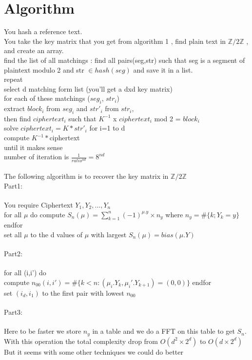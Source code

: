 \documentclass{article}
\begin{document}
\section{Algorithm}
You hash a reference text.\\
You take the key matrix that you get from algorithm 1 , find plain text in $\mathbb{Z}/2\mathbb{Z}$ , and create an array.\\
find the list of all matchings : find all pairs(seg,str) such that seg is a segment of plaintext modulo 2 and str $\in hash(seg)$ and save it in a list.\\
repeat\\
select d matching form list (you'll get a dxd key matrix)\\
for each of these matchings ($seg_{i}$, $str_{i}$)\\
extract $block_{i}$ from $seg_{i}$ and $str'_{i}$ from $str_{i}$,\\
then find $ciphertext_{i}$ such that $K^{-1}$ x $ciphertext_{i}$ mod 2 = $block_{i}$\\
solve $ciphertext_{i} = K * str'_{i}$ for i=1 to d\\
compute $K^{-1} * $ciphertext\\
until it makes sense\\
number of iteration is $ \frac{1}{ratio^{nd}} = 8^{nd}$
\\
\\
The following algorithm is to recover the key matrix in $\mathbb{Z}/2\mathbb{Z}$\\
Part1:\\
\\
You require Ciphertext $Y_1,Y_2,...,Y_n$\\
for all $\mu$ do
compute $S_n(\mu) = \sum_{k=1}^{n}{(-1)^{\mu.y} \times n_y}$ where $n_y=\#\{k;Y_k=y\}$\\
endfor\\
set all $\mu$ to the d values of $\mu$ with largest $S_n(\mu)=bias(\mu.Y)$\\
\\
Part2:\\
\\
for all (i,i') do\\
compute $n_{00}(i,i')=\#\{k<n:(\mu_i .Y_k,\mu_i'.Y_{k+1})=(0,0)\}$
endfor\\
set $(i_d,i_1)$ to the first pair with lowest $n_{00}$\\
\\
Part3:\\
\\
Here to be faster we store $n_y$ in a table and we do a FFT on this table to get $S_n$. With this operation the total complexity drop from $O(d^2 \times 2^d)$ to $O(d \times 2^d)$
But it seems with some other techniques we could do better
\end{document}
